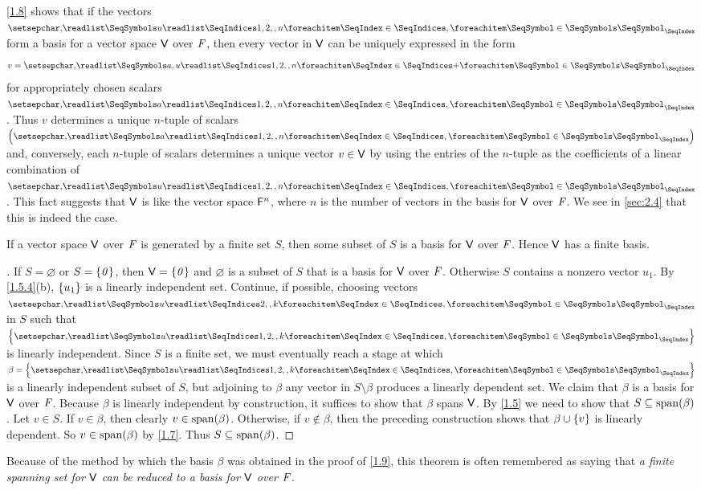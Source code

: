 \begin{note}
  \cref{1.8} shows that if the vectors \(\seq{u}{1,2,,n}\) form a basis for a vector space \(\mathsf{V}\) over \(\mathit{F}\), then every vector in \(\mathsf{V}\) can be uniquely expressed in the form
  \[
    v = \seq[+]{a,u}{1,2,,n}
  \]
  for appropriately chosen scalars \(\seq{a}{1,2,,n}\).
  Thus \(v\) determines a unique \(n\)-tuple of scalars \(\tuple{a}{1,2,,n}\) and, conversely, each \(n\)-tuple of scalars determines a unique vector \(v \in \mathsf{V}\) by using the entries of the \(n\)-tuple as the coefficients of a linear combination of \(\seq{u}{1,2,,n}\).
  This fact suggests that \(\mathsf{V}\) is like the vector space \(\mathsf{F}^n\), where \(n\) is the number of vectors in the basis for \(\mathsf{V}\) over \(\mathit{F}\).
  We see in \cref{sec:2.4} that this is indeed the case.
\end{note}

\begin{thm}\label{1.9}
  If a vector space \(\mathsf{V}\) over \(\mathit{F}\) is generated by a finite set \(S\), then some subset of \(S\) is a basis for \(\mathsf{V}\) over \(\mathit{F}\).
  Hence \(\mathsf{V}\) has a finite basis.
\end{thm}

\begin{proof}[]
  If \(S = \varnothing\) or \(S = \left\lbrace\mathit{0}\right\rbrace\), then \(\mathsf{V} = \left\lbrace\mathit{0}\right\rbrace\) and \(\varnothing\) is a subset of \(S\) that is a basis for \(\mathsf{V}\) over \(\mathit{F}\).
  Otherwise \(S\) contains a nonzero vector \(u_1\).
  By \cref{1.5.4}(b), \(\left\lbrace u_1\right\rbrace\) is a linearly independent set.
  Continue, if possible, choosing vectors \(\seq{u}{2,,k}\) in \(S\) such that \(\set{\seq{u}{1,2,,k}}\) is linearly independent.
  Since \(S\) is a finite set, we must eventually reach a stage at which \(\beta = \set{\seq{u}{1,2,,k}}\) is a linearly independent subset of \(S\), but adjoining to \(\beta\) any vector in \(S \setminus \beta\) produces a linearly dependent set.
  We claim that \(\beta\) is a basis for \(\mathsf{V}\) over \(\mathit{F}\).
  Because \(\beta\) is linearly independent by construction, it suffices to show that \(\beta\) spans \(\mathsf{V}\).
  By \cref{1.5} we need to show that \(S \subseteq \spn{\beta}\).
  Let \(v \in S\).
  If \(v \in \beta\), then clearly \(v \in \spn{\beta}\).
  Otherwise, if \(v \notin \beta\), then the preceding construction shows that \(\beta \cup \left\lbrace v\right\rbrace\) is linearly dependent.
  So \(v \in \spn{\beta}\) by \cref{1.7}.
  Thus \(S \subseteq \spn{\beta}\).
\end{proof}

\begin{note}
  Because of the method by which the basis \(\beta\) was obtained in the proof of \cref{1.9}, this theorem is often remembered as saying that \emph{a finite spanning set for \(\mathsf{V}\) can be reduced to a basis for \(\mathsf{V}\) over \(\mathit{F}\).}
\end{note}

